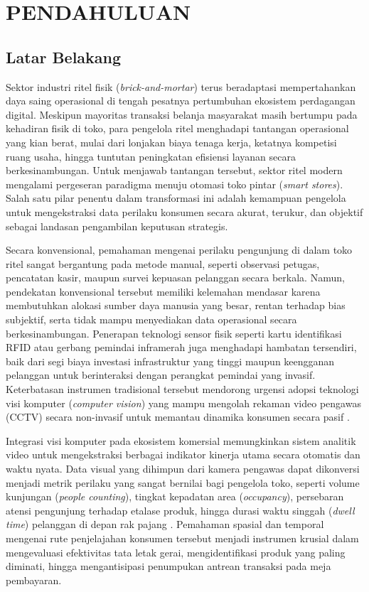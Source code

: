 \chapter[PENDAHULUAN]{PENDAHULUAN}
\sloppy

\section{Latar Belakang}

Sektor industri ritel fisik (\textit{brick-and-mortar}) terus beradaptasi mempertahankan daya saing operasional di tengah pesatnya pertumbuhan ekosistem perdagangan digital. Meskipun mayoritas transaksi belanja masyarakat masih bertumpu pada kehadiran fisik di toko, para pengelola ritel menghadapi tantangan operasional yang kian berat, mulai dari lonjakan biaya tenaga kerja, ketatnya kompetisi ruang usaha, hingga tuntutan peningkatan efisiensi layanan secara berkesinambungan. Untuk menjawab tantangan tersebut, sektor ritel modern mengalami pergeseran paradigma menuju otomasi toko pintar (\textit{smart stores}). Salah satu pilar penentu dalam transformasi ini adalah kemampuan pengelola untuk mengekstraksi data perilaku konsumen secara akurat, terukur, dan objektif sebagai landasan pengambilan keputusan strategis.

Secara konvensional, pemahaman mengenai perilaku pengunjung di dalam toko ritel sangat bergantung pada metode manual, seperti observasi petugas, pencatatan kasir, maupun survei kepuasan pelanggan secara berkala. Namun, pendekatan konvensional tersebut memiliki kelemahan mendasar karena membutuhkan alokasi sumber daya manusia yang besar, rentan terhadap bias subjektif, serta tidak mampu menyediakan data operasional secara berkesinambungan. Penerapan teknologi sensor fisik seperti kartu identifikasi RFID atau gerbang pemindai inframerah juga menghadapi hambatan tersendiri, baik dari segi biaya investasi infrastruktur yang tinggi maupun keengganan pelanggan untuk berinteraksi dengan perangkat pemindai yang invasif. Keterbatasan instrumen tradisional tersebut mendorong urgensi adopsi teknologi visi komputer (\textit{computer vision}) yang mampu mengolah rekaman video pengawas (CCTV) secara non-invasif untuk memantau dinamika konsumen secara pasif \cite{fierrosilva2026, hairurizal2026}.

Integrasi visi komputer pada ekosistem komersial memungkinkan sistem analitik video untuk mengekstraksi berbagai indikator kinerja utama secara otomatis dan waktu nyata. Data visual yang dihimpun dari kamera pengawas dapat dikonversi menjadi metrik perilaku yang sangat bernilai bagi pengelola toko, seperti volume kunjungan (\textit{people counting}), tingkat kepadatan area (\textit{occupancy}), persebaran atensi pengunjung terhadap etalase produk, hingga durasi waktu singgah (\textit{dwell time}) pelanggan di depan rak pajang \cite{shili2024electronics, narvilas2022}. Pemahaman spasial dan temporal mengenai rute penjelajahan konsumen tersebut menjadi instrumen krusial dalam mengevaluasi efektivitas tata letak gerai, mengidentifikasi produk yang paling diminati, hingga mengantisipasi penumpukan antrean transaksi pada meja pembayaran.


